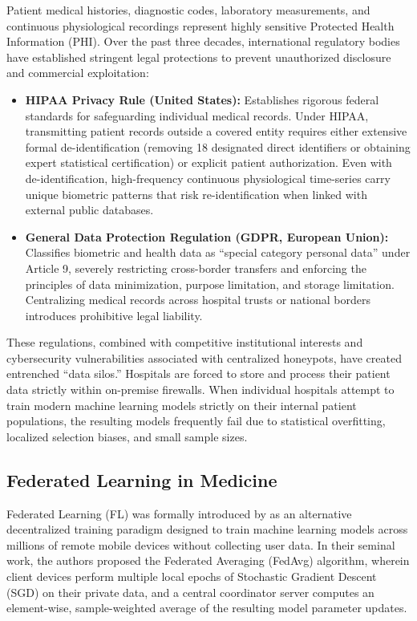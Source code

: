 \documentclass[12pt,a4paper,oneside]{report}
\begin{document}
Patient medical histories, diagnostic codes, laboratory measurements, and continuous physiological recordings represent highly sensitive Protected Health Information (PHI). Over the past three decades, international regulatory bodies have established stringent legal protections to prevent unauthorized disclosure and commercial exploitation:
\begin{itemize}
    \item \textbf{HIPAA Privacy Rule (United States):} Establishes rigorous federal standards for safeguarding individual medical records. Under HIPAA, transmitting patient records outside a covered entity requires either extensive formal de-identification (removing 18 designated direct identifiers or obtaining expert statistical certification) or explicit patient authorization. Even with de-identification, high-frequency continuous physiological time-series carry unique biometric patterns that risk re-identification when linked with external public databases.
    \item \textbf{General Data Protection Regulation (GDPR, European Union):} Classifies biometric and health data as ``special category personal data'' under Article 9, severely restricting cross-border transfers and enforcing the principles of data minimization, purpose limitation, and storage limitation. Centralizing medical records across hospital trusts or national borders introduces prohibitive legal liability.
\end{itemize}
These regulations, combined with competitive institutional interests and cybersecurity vulnerabilities associated with centralized honeypots, have created entrenched ``data silos.'' Hospitals are forced to store and process their patient data strictly within on-premise firewalls. When individual hospitals attempt to train modern machine learning models strictly on their internal patient populations, the resulting models frequently fail due to statistical overfitting, localized selection biases, and small sample sizes.

\subsection{Federated Learning in Medicine}
\label{subsec:fl_in_medicine}

Federated Learning (FL) was formally introduced by \citet{mcmahan2017communication} as an alternative decentralized training paradigm designed to train machine learning models across millions of remote mobile devices without collecting user data. In their seminal work, the authors proposed the Federated Averaging (FedAvg) algorithm, wherein client devices perform multiple local epochs of Stochastic Gradient Descent (SGD) on their private data, and a central coordinator server computes an element-wise, sample-weighted average of the resulting model parameter updates.
\end{document}
